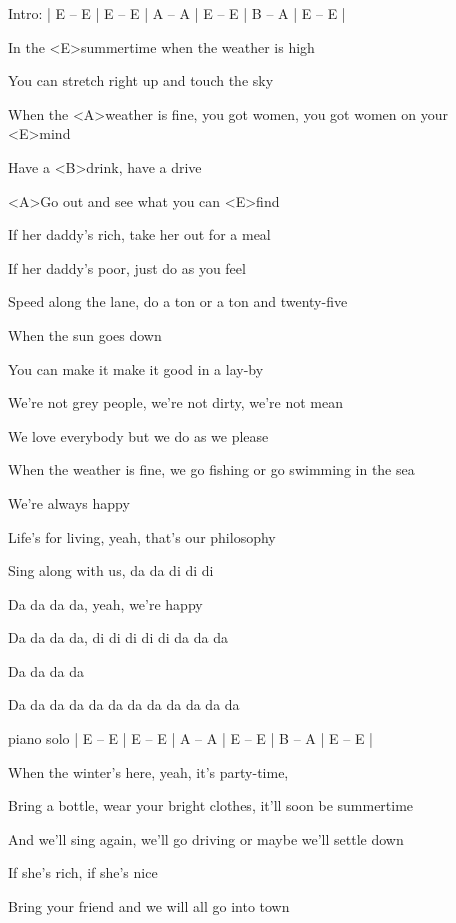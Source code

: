 

\ifdefined\TPBAND

	Intro: 
	| E – E | E – E | A – A | E – E | B – A | E – E | 
\fi

\zs
In the <E>summertime when the weather is high
 
You can stretch right up and touch the sky

When the <A>weather is fine, you got women, you got women on your <E>mind

Have a <B>drink, have a drive

<A>Go out and see what you can <E>find
\ks

\zs
If her daddy's rich, take her out for a meal
 
If her daddy's poor, just do as you feel

Speed along the lane, do a ton or a ton and twenty-five
 
When the sun goes down

You can make it make it good in a lay-by
\ks

\zs
We're not grey people, we're not dirty, we're not mean
 
We love everybody but we do as we please

When the weather is fine, we go fishing or go swimming in the sea

We're always happy

Life's for living, yeah, that's our philosophy
\ks

\zs
Sing along with us, da da di di di 
 
Da da da da, yeah, we're happy 

Da da da da, di di di di di da da da 

Da da da da

Da da da da da da da da da da da da 
\ks

\ifdefined\TPBAND
	piano solo 
	| E – E | E – E | A – A | E – E | B – A | E – E | 
\fi

\zs
When the winter's here, yeah, it's party-time,
 
Bring a bottle, wear your bright clothes, it'll soon be summertime

And we'll sing again, we'll go driving or maybe we'll settle down
 
If she's rich, if she's nice

Bring your friend and we will all go into town
\ks

\kp
